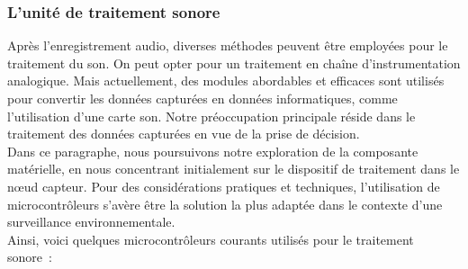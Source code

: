\subsubsection{L’unité de traitement sonore}
Après l'enregistrement audio, diverses méthodes peuvent être employées pour le traitement du son. On peut opter pour un traitement en chaîne d'instrumentation analogique. Mais actuellement, des modules abordables et efficaces sont utilisés pour convertir les données capturées en données informatiques, comme l'utilisation d'une carte son. Notre préoccupation principale réside dans le traitement des données capturées en vue de la prise de décision. 
\\

Dans ce paragraphe, nous poursuivons notre exploration de la composante matérielle, en nous concentrant initialement sur le dispositif de traitement dans le nœud capteur. Pour des considérations pratiques et techniques, l'utilisation de microcontrôleurs s'avère être la solution la plus adaptée dans le contexte d'une surveillance environnementale.
\\

Ainsi, voici quelques microcontrôleurs courants utilisés pour le traitement sonore :

